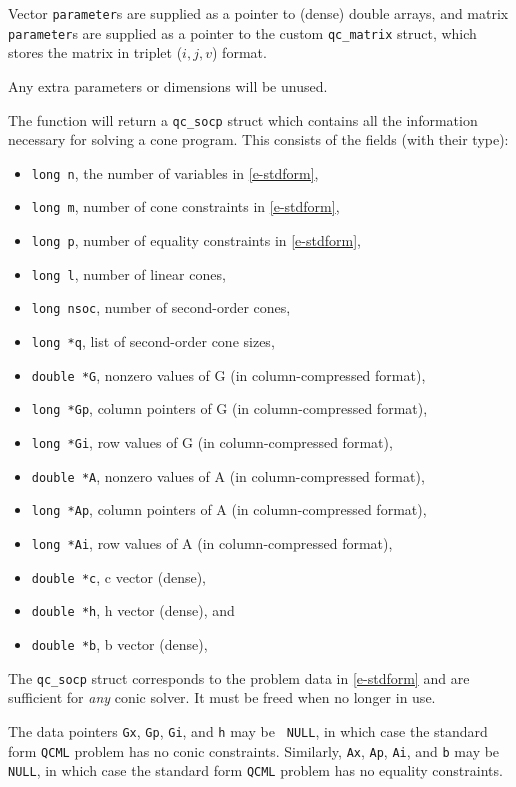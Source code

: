 \documentclass[11pt]{article}
\def\qcml{\texttt{QCML}\xspace}
\begin{document}
Vector {\tt parameter}s
are supplied as a pointer to (dense) double arrays, and matrix {\tt
parameter}s are supplied as a pointer to the custom {\tt qc\_matrix} struct,
which stores the matrix in triplet ($i,j,v$) format.

Any extra parameters or dimensions will be unused. 

The function will return a {\tt qc\_socp} struct which contains all the
information necessary for solving a cone program. This consists of the 
fields (with their type):
\begin{itemize}
  \item {\tt long n}, the number of variables in \eqref{e-stdform},
  \item {\tt long m}, number of cone constraints in \eqref{e-stdform},
  \item {\tt long p}, number of equality constraints in \eqref{e-stdform},
  \item {\tt long l}, number of linear cones,
  \item {\tt long nsoc}, number of second-order cones, 
  \item {\tt long *q}, list of second-order cone sizes,
  \item {\tt double *G}, nonzero values of G (in column-compressed format),  
  \item {\tt long *Gp}, column pointers of G (in column-compressed format), 
  \item {\tt long *Gi}, row values of G (in column-compressed format), 
  \item {\tt double *A}, nonzero values of A (in column-compressed format),  
  \item {\tt long *Ap}, column pointers of A (in column-compressed format), 
  \item {\tt long *Ai}, row values of A (in column-compressed format), 
  \item {\tt double *c}, c vector (dense),       
  \item {\tt double *h}, h vector (dense), and            
  \item {\tt double *b}, b vector (dense),              
\end{itemize}
The {\tt qc\_socp} struct corresponds to the problem data in \eqref{e-stdform}
and are sufficient for \emph{any} conic solver. It must be freed when no
longer in use.

The data pointers {\tt Gx}, {\tt Gp}, {\tt Gi}, and {\tt h} may be {\tt
NULL}, in which case the standard form \qcml problem has no conic
constraints. Similarly, {\tt Ax}, {\tt Ap}, {\tt Ai}, and {\tt b} may be {\tt
NULL}, in which case the standard form \qcml problem has no equality
constraints.
\end{document}
